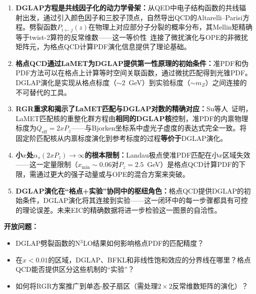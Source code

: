 \documentclass[12pt,a4paper]{ctexart}
\theoremstyle{definition}
\begin{document}
\begin{enumerate}[leftmargin=*]

    \item \textbf{DGLAP方程是共线因子化的动力学骨架：}从QED中电子结构函数的共线辐射出发，通过引入颜色因子和三胶子顶点，自然导出QCD的Altarelli--Parisi方程。劈裂函数$P_{i\leftarrow j}(z)$在物理上对应部分子分裂的概率分布，其Mellin矩精确等于twist-2算符的反常维数——这一等价性~\cite{PeskinSchroeder1995}连接了微扰演化与OPE的非微扰矩阵元，为格点QCD计算PDF演化信息提供了理论基础。

    \item \textbf{格点QCD通过LaMET为DGLAP提供第一性原理的初始条件：}准PDF和伪PDF方法可以在格点上计算等时空间关联函数，通过微扰匹配得到光锥PDF。DGLAP演化是实现从格点标度（$\sim 2$~GeV）到实验标度（$\sim m_Z$）之间连接的不可替代的工具。

    \item \textbf{RGR重求和揭示了LaMET匹配与DGLAP对数的精确对应：}Su等人~\cite{Su2023RGR}证明，LaMET匹配核的重整化群方程由\textbf{相同的DGLAP核}控制，准PDF的内禀物理标度为$Q_{\text{eff}} = 2xP_z$——与Bjorken坐标系中虚光子虚度的表达式完全一致。将固定阶匹配核从内禀标度演化到参考标度的过程\textbf{等价于}DGLAP演化。

    \item \textbf{小$x$处$\alpha_s(2xP_z) \to \infty$的根本限制：}Landau极点使准PDF匹配在小$x$区域失效——这一定量限制（$x_{\min} \sim 0.06$对$P_z = 2.5$~GeV）是格点QCD计算PDF的下限，需通过更大的强子动量或与OPE的混合方案来突破。

    \item \textbf{DGLAP演化在``格点+实验''协同中的枢纽角色：}格点QCD提供DGLAP的初始条件，DGLAP演化将其连接到实验——这一闭环中的每一步骤都具有可控的理论误差。未来EIC的精确数据将进一步检验这一图景的自洽性。

\end{enumerate}

\textbf{开放问题：}
\begin{itemize}
    \item DGLAP劈裂函数的N$^3$LO结果如何影响格点PDF的匹配精度？
    \item 在$x < 0.01$的区域，DGLAP、BFKL和非线性饱和效应的分界线在哪里？格点QCD能否提供区分这些机制的``实验''？
    \item 如何将RGR方案推广到单态-胶子扇区（需处理$2\times2$反常维数矩阵的演化）？
\end{itemize}
\end{document}
